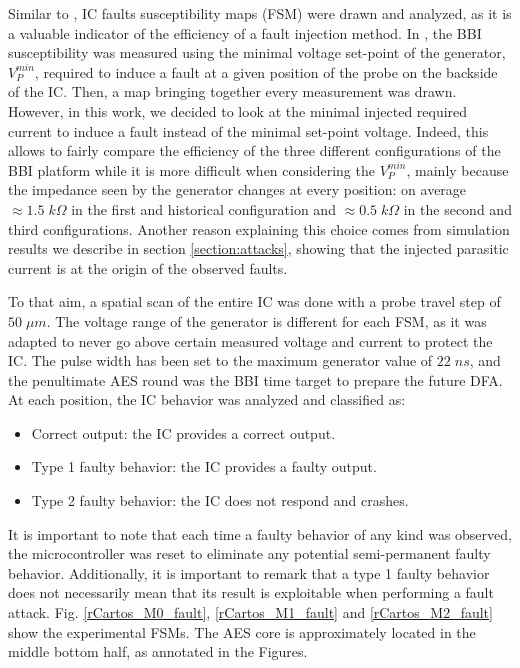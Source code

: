 \documentclass[10pt, conference, compsocconf]{IEEEtran}
\begin{document}
Similar to \cite{mybbi1}, IC faults susceptibility maps (FSM) were drawn and analyzed, as it is a valuable indicator of the efficiency of a fault injection method.
In \cite{mybbi1}, the BBI susceptibility was measured using the minimal voltage set-point of the generator, $V_{P}^{min}$, required to induce a fault at a given position of the probe on the backside of the IC.
Then, a map bringing together every measurement was drawn.
However, in this work, we decided to look at the minimal injected required current to induce a fault instead of the minimal set-point voltage.
Indeed, this allows to fairly compare the efficiency of the three different configurations of the BBI platform while it is more difficult when considering the $V_{P}^{min}$, mainly because the impedance seen by the generator changes at every position: on average $\approx 1.5 \; k\Omega $ in the first and historical configuration and $\approx 0.5 \; k\Omega $ in the second and third configurations.
Another reason explaining this choice comes from simulation results we describe in section \ref{section:attacks}, showing that the injected parasitic current is at the origin of the observed faults.

To that aim, a spatial scan of the entire IC was done with a probe travel step of $50 \; \mu m$.
The voltage range of the generator is different for each FSM, as it was adapted to never go above certain measured voltage and current to protect the IC.
The pulse width has been set to the maximum generator value of $22 \; ns$, and the penultimate AES round was the BBI time target to prepare the future DFA.
At each position, the IC behavior was analyzed and classified as:
\begin{itemize}
    \item Correct output: the IC provides a correct output.
    \item Type 1 faulty behavior: the IC provides a faulty output.
    \item Type 2 faulty behavior: the IC does not respond and crashes.
\end{itemize}
It is important to note that each time a faulty behavior of any kind was observed, the microcontroller was reset to eliminate any potential semi-permanent faulty behavior.
Additionally, it is important to remark that a type 1 faulty behavior does not necessarily mean that its result is exploitable when performing a fault attack.
Fig. \ref{rCartos_M0_fault}, \ref{rCartos_M1_fault} and \ref{rCartos_M2_fault} show the experimental FSMs.
The AES core is approximately located in the middle bottom half, as annotated in the Figures.
\end{document}
